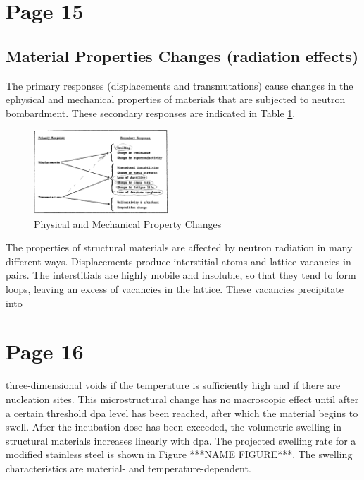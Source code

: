 \documentclass[11pt]{article}
\begin{document}
\section{Page 15}
\subsection{Material Properties Changes (radiation effects)}
The primary responses (displacements and transmutations) cause changes in the ephysical and mechanical properties of materials that are subjected to neutron bombardment. These secondary responses are indicated in Table \ref{fig:table2}.


\begin{figure}[h!]
  \centering
  \includegraphics[width=0.45\textwidth]{tables/table2.png}
  \caption{Physical and Mechanical Property Changes}
  \label{fig:table2}
\end{figure}

The properties of structural materials are affected by neutron radiation in many different ways. Displacements produce interstitial atoms and lattice vacancies in pairs. The interstitials are highly mobile and insoluble, so that they tend to form loops, leaving an excess of vacancies in the lattice. These vacancies precipitate into 

\section{Page 16}
three-dimensional voids if the temperature is sufficiently high and if there are nucleation sites. This microstructural change has no macroscopic effect until after a certain threshold dpa level has been reached, after which the material begins to swell. After the incubation dose has been exceeded, the volumetric swelling in structural materials increases linearly with dpa. The projected swelling rate for a modified stainless steel is shown in Figure ***NAME FIGURE***. The swelling characteristics are material- and temperature-dependent.
\end{document}
